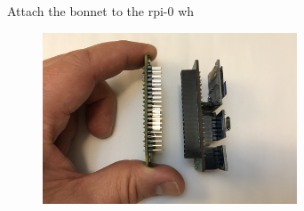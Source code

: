 \begin{frame}
   {Attach the bonnet to the rpi-0 wh}
   \begin{figure}[H]
      \centering
      \includegraphics[height=2in]{IMAGES/rpi0wh-assemble}
   \end{figure}
\end{frame}

\cprotect\note{


}

